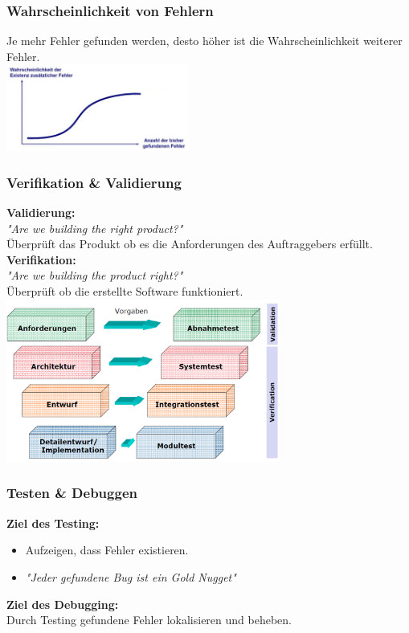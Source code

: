 \begin{multicols}{2}
\subsubsection{Wahrscheinlichkeit von Fehlern}
Je mehr Fehler gefunden werden, desto höher ist die Wahrscheinlichkeit weiterer Fehler.\\
\includegraphics[width=6cm]{images/fehler_wkeit}

	\subsubsection{Verifikation \& Validierung}
	\textbf{Validierung:}\\
	\textit{"{}Are we building the right product?"}\\
	Überprüft das Produkt ob es die Anforderungen des Auftraggebers erfüllt.\\
	\textbf{Verifikation:}\\
	\textit{"{}Are we building the product right?"}\\
	Überprüft ob die erstellte Software funktioniert.\\
	\includegraphics[width=9cm]{images/verificationvalidation}
	
	\subsubsection{Testen \& Debuggen}
	\textbf{Ziel des Testing:} \\
	\begin{minipage}{10cm}
	\vspace{0.2cm}
	\begin{itemize}
		\item Aufzeigen, dass Fehler existieren.
		\item \textit{"{}Jeder gefundene Bug ist ein Gold Nugget"}
	\end{itemize}
	\textbf{Ziel des Debugging:} \\
	Durch Testing gefundene Fehler lokalisieren und beheben.
\end{minipage}


\end{multicols}
